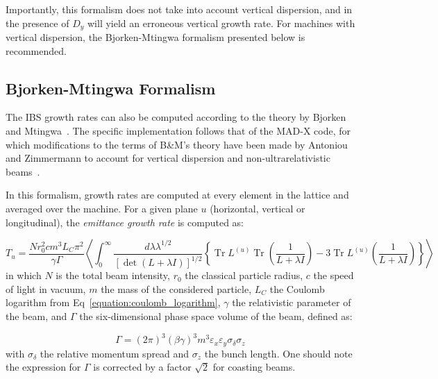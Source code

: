 Importantly, this formalism does not take into account vertical dispersion, and in the presence of \(D_y\) will yield an erroneous vertical growth rate.
For machines with vertical dispersion, the Bjorken-Mtingwa formalism presented below is recommended.

\subsection{Bjorken-Mtingwa Formalism}
\label{subsection:bjorken_mtingwa_formalism}

The IBS growth rates can also be computed according to the theory by Bjorken and Mtingwa~\cite{CERN:Bjorken_Mtingwa:Intrabeam_Scattering}.
The specific implementation follows that of the MAD-X code, for which modifications to the terms of B\&M's theory have been made by Antoniou and Zimmermann to account for vertical dispersion and non-ultrarelativistic beams~\cite{CERN:Antoniou:Revision_IBS_MADX}.
\newline

In this formalism, growth rates are computed at every element in the lattice and averaged over the machine.
For a given plane \(u\) (horizontal, vertical or longitudinal), the \textit{emittance growth rate} is computed as:

\begin{equation}
    T_u = \frac{N r_0^{2} c m^3 L_C \pi^{2}}{\gamma \Gamma} \left\langle \int_0^{\infty} \frac{d \lambda \lambda^{1 / 2}}{\left[\operatorname{det}(L + \lambda I)\right]^{1/2}} \left\{\operatorname{Tr} L^{(u)} \operatorname{Tr}\left(\frac{1}{L + \lambda I}\right) - 3 \operatorname{Tr} L^{(u)} \left(\frac{1}{L + \lambda I}\right)\right\}\right\rangle
    \label{equation:bjorken_mtingwa_original}
\end{equation}
in which \(N\) is the total beam intensity, \(r_0\) the classical particle radius, \(c\) the speed of light in vacuum, \(m\) the mass of the considered particle, \(L_C\) the Coulomb logarithm from Eq~\eqref{equation:coulomb_logarithm}, \(\gamma\) the relativistic parameter of the beam, and \(\Gamma\) the six-dimensional phase space volume of the beam, defined as:

\begin{equation}
    \Gamma = \left( 2 \pi \right)^3 \left( \beta \gamma \right)^3 m^3 \varepsilon_x \varepsilon_y \sigma_{\delta} \sigma_z
\end{equation}
with \(\sigma_{\delta}\) the relative momentum spread and \(\sigma_z\) the bunch length.
One should note the expression for \(\Gamma\) is corrected by a factor \(\sqrt{2}\) for coasting beams.

